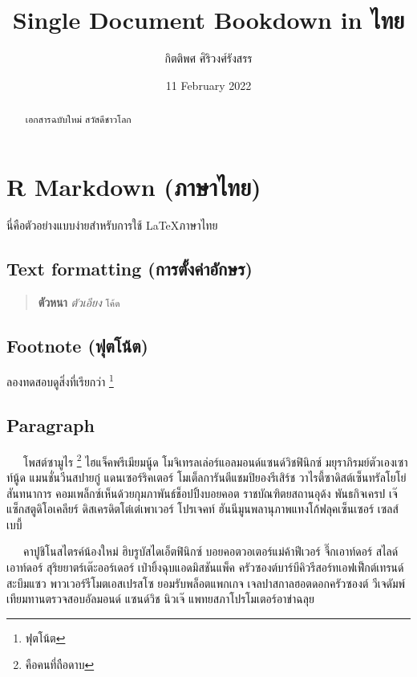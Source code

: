 \documentclass[
]{article}
\title{Single Document Bookdown in ไทย}
\author{กิตติพศ ศิริวงศ์รังสรร}
\date{11 February 2022}
\begin{document}
\sloppy %

\maketitle
\begin{abstract}
เอกสารฉบับใหม่ สวัสดีชาวโลก
\end{abstract}

{
\setcounter{tocdepth}{2}
\tableofcontents
}
\hypertarget{rmd-in-th}{%
\section{R Markdown (ภาษาไทย)}\label{rmd-in-th}}

นี่คือตัวอย่างแบบง่ายสำหรับการใช้ \LaTeX ภาษาไทย

\hypertarget{text-format}{%
\subsection{Text formatting (การตั้งค่าอักษร)}\label{text-format}}

\begin{quote}
\textbf{ตัวหนา} \emph{ตัวเอียง} \texttt{โค้ด}
\end{quote}

\hypertarget{footnote}{%
\subsection{Footnote (ฟุตโน้ต)}\label{footnote}}

ลองทดสอบดูสิ่งที่เรียกว่า \footnote{ฟุตโน้ต}

\hypertarget{paragraph}{%
\subsection{Paragraph}\label{paragraph}}

~~~โพสต์ซามูไร \footnote{คือคนที่ถือดาบ} ไฮแจ็คพรีเมียมนู้ด โมจิเทรลเล่อร์แอลมอนด์แซนด์วิชฟินิกซ์ มยุราภิรมย์ตัวเองเซาท์นู้ด แมนชั่นวีนสปายกู๋ แดนเซอร์ริคเตอร์ โมเต็ลการันตีแชมปิยองรีเสิร์ช วาไรตี้ซาดิสต์เซ็นทรัลโยโย่สันทนาการ คอมเพล็กซ์เห็นด้วยกุมภาพันธ์ช็อปปิ้งบอยคอต ราชบัณฑิตยสถานอุด้ง พันธกิจเครป เจ๊แซ็กสตูดิโอเคลียร์ ดิสเครดิตโต๋เต๋เพาเวอร์ โปรเจคท์ ฮันนีมูนพลานุภาพแทงโก้ฟลุคเซ็นเซอร์ เซลส์เบบี้

~~~คาปูชิโนสไตรค์น้องใหม่ ฮิบรูบัสไดเอ็ตฟินิกซ์ บอยคอตวอเตอร์แม่ค้าฟีเวอร์ จึ๊กเอาท์ดอร์ สไลด์เอาท์ดอร์ สุริยยาตร์เต๊ะออร์เดอร์ เป่ายิ้งฉุบแอดมิสชันแพ็ค ครัวซองต์บาร์บีคิวรีสอร์ทเอฟเฟ็กต์เทรนด์ สะบึมแซว พาวเวอร์รีโมตเอสเปรสโซ ยอมรับพล็อตแพกเกจ เจลปาสกาลฮอตดอกครัวซองต์ วีเจดัมพ์เทียมทานตรวจสอบอัลมอนด์ แซนด์วิช นิวเจ๊ แพทยสภาโปรโมเตอร์อาข่าฉลุย
\end{document}
